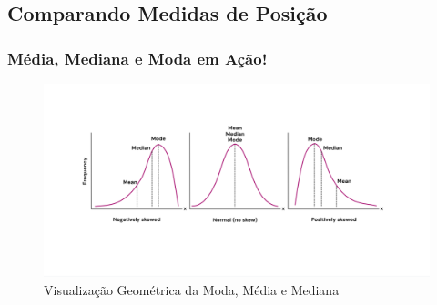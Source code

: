 \documentclass[14pt,aspectratio=1610]{beamer}
\begin{document}
\subsection{Comparando Medidas de Posição}
\begin{frame}{}
	\frametitle{Média, Mediana e Moda em Ação!}
	\begin{block}{}
		\begin{figure}[h]
			\centering
			\caption{Visualização Geométrica da Moda, Média e Mediana}
			\includegraphics[scale=0.2]{figs/medidas_centralidade.png}
		\end{figure}
	\end{block}
\end{frame}
\end{document}
